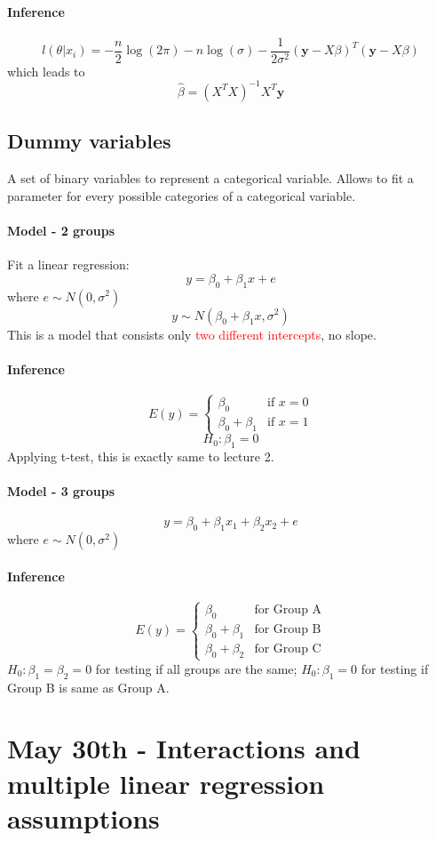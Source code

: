\documentclass[11pt]{article}
\newcommand{\tb}[1]{\textbf{#1}}
\newcommand{\vy}[0]{\tb{y}}
\begin{document}
\paragraph{Inference}
$$l(\theta|x_i) = -\frac{n}{2} \log(2\pi) - n\log(\sigma) - \frac{1}{2\sigma^2}(\vy - X\beta)^T(\vy - X\beta)$$
which leads to $$\hat{\beta} = (X^TX)^{-1}X^T\vy$$
\subsection{Dummy variables}
A set of binary variables to represent a categorical variable.
Allows to fit a parameter for every possible categories of a categorical variable.
\paragraph{Model - 2 groups}
Fit a linear regression:
$$y = \beta_0 + \beta_1x + e$$ where $e \sim N(0, \sigma^2)$
$$y \sim N(\beta_0 + \beta_1 x, \sigma^2)$$
This is a model that consists only \textcolor{red}{two different intercepts}, no slope.
\paragraph{Inference}
$$E(y) = \begin{cases}
	\beta_0 & \text{if $x = 0$} \\
	\beta_0 + \beta_1 &\text{if $x = 1$}
\end{cases}$$
$$H_0: \beta_1 = 0$$
Applying t-test, this is exactly same to lecture 2.
\paragraph{Model - 3 groups}
$$y = \beta_0 + \beta_1 x_1 + \beta_2 x_2 + e$$
where $e \sim N(0, \sigma^2)$
\paragraph{Inference}
$$E(y) = \begin{cases}
	\beta_0 & \text{for Group A} \\
	\beta_0 + \beta_1 &\text{for Group B} \\
	\beta_0 + \beta_2 &\text{for Group C}
\end{cases}$$
$H_0: \beta_1 = \beta_2 = 0$ for testing if all groups are the same; $H_0: \beta_1 = 0$ for testing if Group B is same as Group A.

\section{May 30th - Interactions and multiple linear regression assumptions}
\end{document}
